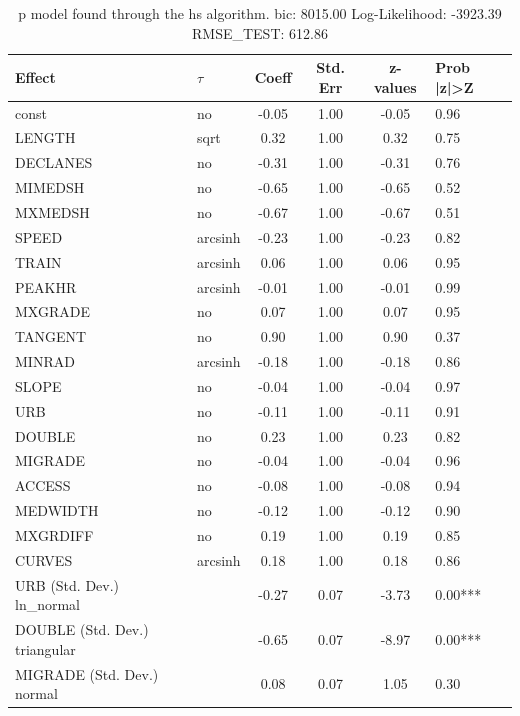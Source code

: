 \begin{table}
	\caption{p model found through the hs algorithm. bic: 8015.00 Log-Likelihood: -3923.39 RMSE_TEST: 612.86}
	\begin{center}
		\begin{tabular}{|l|l|c|c|c|l|}
			\hline
			Effect & $\tau$ & Coeff & Std. Err & z-values & Prob |z|>Z \\
			\hline
			const & no & -0.05 & 1.00 & -0.05 & 0.96 \\
			\hline
			LENGTH & sqrt & 0.32 & 1.00 & 0.32 & 0.75 \\
			\hline
			DECLANES & no & -0.31 & 1.00 & -0.31 & 0.76 \\
			\hline
			MIMEDSH & no & -0.65 & 1.00 & -0.65 & 0.52 \\
			\hline
			MXMEDSH & no & -0.67 & 1.00 & -0.67 & 0.51 \\
			\hline
			SPEED & arcsinh & -0.23 & 1.00 & -0.23 & 0.82 \\
			\hline
			TRAIN & arcsinh & 0.06 & 1.00 & 0.06 & 0.95 \\
			\hline
			PEAKHR & arcsinh & -0.01 & 1.00 & -0.01 & 0.99 \\
			\hline
			MXGRADE & no & 0.07 & 1.00 & 0.07 & 0.95 \\
			\hline
			TANGENT & no & 0.90 & 1.00 & 0.90 & 0.37 \\
			\hline
			MINRAD & arcsinh & -0.18 & 1.00 & -0.18 & 0.86 \\
			\hline
			SLOPE & no & -0.04 & 1.00 & -0.04 & 0.97 \\
			\hline
			URB & no & -0.11 & 1.00 & -0.11 & 0.91 \\
			\hline
			DOUBLE & no & 0.23 & 1.00 & 0.23 & 0.82 \\
			\hline
			MIGRADE & no & -0.04 & 1.00 & -0.04 & 0.96 \\
			\hline
			ACCESS & no & -0.08 & 1.00 & -0.08 & 0.94 \\
			\hline
			MEDWIDTH & no & -0.12 & 1.00 & -0.12 & 0.90 \\
			\hline
			MXGRDIFF & no & 0.19 & 1.00 & 0.19 & 0.85 \\
			\hline
			CURVES & arcsinh & 0.18 & 1.00 & 0.18 & 0.86 \\
			\hline
			URB (Std. Dev.) ln_normal &  & -0.27 & 0.07 & -3.73 & 0.00*** \\
			\hline
			DOUBLE (Std. Dev.) triangular &  & -0.65 & 0.07 & -8.97 & 0.00*** \\
			\hline
			MIGRADE (Std. Dev.) normal &  & 0.08 & 0.07 & 1.05 & 0.30 \\

\end{tabular}
\end{center}
\end{table}
